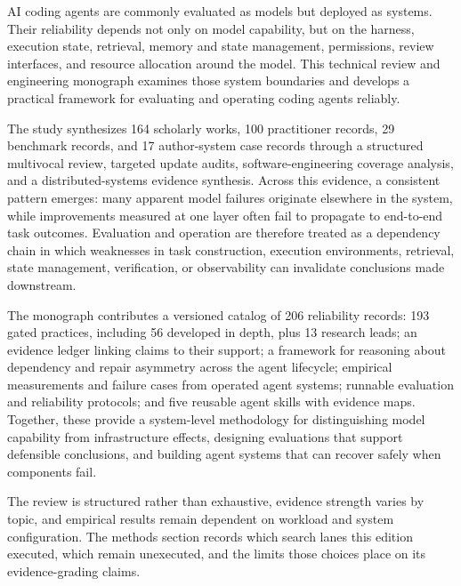 AI coding agents are commonly evaluated as models but deployed as systems. Their reliability depends not only on model capability, but on the harness, execution state, retrieval, memory and state management, permissions, review interfaces, and resource allocation around the model. This technical review and engineering monograph examines those system boundaries and develops a practical framework for evaluating and operating coding agents reliably.

The study synthesizes 164 scholarly works, 100 practitioner records, 29 benchmark records, and 17 author-system case records through a structured multivocal review, targeted update audits, software-engineering coverage analysis, and a distributed-systems evidence synthesis. Across this evidence, a consistent pattern emerges: many apparent model failures originate elsewhere in the system, while improvements measured at one layer often fail to propagate to end-to-end task outcomes. Evaluation and operation are therefore treated as a dependency chain in which weaknesses in task construction, execution environments, retrieval, state management, verification, or observability can invalidate conclusions made downstream.

The monograph contributes a versioned catalog of 206 reliability records: 193 gated practices, including 56 developed in depth, plus 13 research leads; an evidence ledger linking claims to their support; a framework for reasoning about dependency and repair asymmetry across the agent lifecycle; empirical measurements and failure cases from operated agent systems; runnable evaluation and reliability protocols; and five reusable agent skills with evidence maps. Together, these provide a system-level methodology for distinguishing model capability from infrastructure effects, designing evaluations that support defensible conclusions, and building agent systems that can recover safely when components fail.

The review is structured rather than exhaustive, evidence strength varies by topic, and empirical results remain dependent on workload and system configuration. The methods section records which search lanes this edition executed, which remain unexecuted, and the limits those choices place on its evidence-grading claims.
